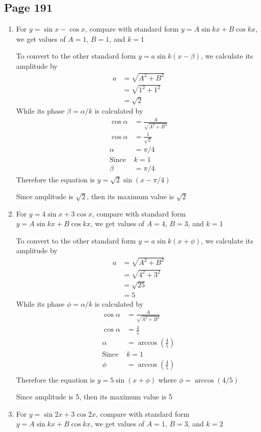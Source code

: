 \documentclass{article}
\newenvironment{solutions}[1]
{\subsection*{#1}
 \begin{enumerate}[leftmargin=1.5em]}
{\end{enumerate}}
\newcommand{\solution}{\item}
\begin{document}
\begin{solutions}{Page 191}
\solution
For $y=\sin x - \cos x$, compare with standard form $y=A\sin kx + B \cos kx$, we get values of $A=1$, $B=1$, and $k=1$

To convert to the other standard form $y=a\sin k(x-\beta)$, we calculate its amplitude by
\begin{align*}
    a &= \sqrt{A^2+B^2}\\
      &= \sqrt{1^2 + 1^2}\\
      &= \sqrt{2}
\end{align*}
While its phase $\beta=\alpha/k$ is calculated by
\begin{align*}
    \cos \alpha &= \frac{A}{\sqrt{A^2+B^2}}\\
    \cos \alpha &= \frac{1}{\sqrt{2}}\\
        \alpha &= \pi/4\\
    \text{Since } & k=1 \\ 
        \beta &= \pi/4
\end{align*}
Therefore the equation is $y=\sqrt{2}\sin\left(x-\pi/4\right)$

Since amplitude is $\sqrt{2}$, then its maximum value is $\sqrt{2}$

\solution
For $y=4\sin x + 3\cos x$, compare with standard form $y=A\sin kx + B \cos kx$, we get values of $A=4$, $B=3$, and $k=1$

To convert to the other standard form $y=a\sin k(x+\phi)$, we calculate its amplitude by
\begin{align*}
    a &= \sqrt{A^2+B^2}\\
      &= \sqrt{4^2 + 3^2}\\
      &= \sqrt{25}\\
      &= 5
\end{align*}
While its phase $\phi=\alpha/k$ is calculated by
\begin{align*}
    \cos \alpha &= \frac{A}{\sqrt{A^2+B^2}}\\
    \cos \alpha &= \frac{4}{5}\\
    \alpha &= \arccos(\frac{4}{5})\\
    \text{Since } & k=1 \\ 
    \phi &= \arccos(\frac{4}{5})\\
\end{align*}
Therefore the equation is $y=5\sin\left(x+\phi\right)$ where $\phi=\arccos(4/5)$

Since amplitude is 5, then its maximum value is 5

\solution
For $y=\sin 2x + 3\cos 2x$, compare with standard form $y=A\sin kx + B \cos kx$, we get values of $A=1$, $B=3$, and $k=2$


\end{solutions}
\end{document}
